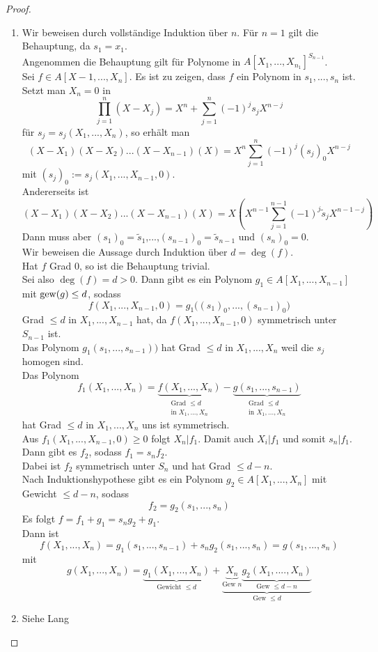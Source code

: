 	\begin{proof}
		\begin{enumerate}
			\item Wir beweisen durch vollständige Induktion über $n$.
			Für $n=1$ gilt die Behauptung, da $s_1=x_1$.\\
			Angenommen die Behauptung gilt für Polynome in $A[X_1,...,X_{n_1}]^{S_{n-1}}$.\\
			Sei $f\in A[X-1,...,X_n]$. Es ist zu zeigen, dass $f$ ein Polynom in $s_1,...,s_n$ ist.\\
			Setzt man $X_n=0$ in 
			\[\prod_{j=1}^{n}(X-X_j)=X^n+\sum_{j=1}^{n}(-1)^js_jX^{n-j}\]
			für $s_j=s_j(X_1,...,X_n)$, so erhält man
			\[(X-X_1)(X-X_2)...(X-X_{n-1})(X)=X^n\sum_{j=1}^{n}(-1)^j (s_j)_0X^{n-j}\]
			mit $(s_j)_0:=s_j(X_1,...,X_{n-1},0)$.\\
			Andererseits ist
			\[(X-X_1)(X-X_2)...(X-X_{n-1})(X)=X\left(X^{n-1}\sum_{j=1}^{n-1}(-1)^j \tilde s_j X^{n-1-j}\right)\]
			Dann muss aber $(s_1)_0=\tilde s_1$,...,$(s_{n-1})_0=\tilde{s}_{n-1}$ und $(s_n)_0=0$.\\
			Wir beweisen die Aussage durch Induktion über $d=\deg(f)$.\\
			Hat $f$ Grad $0$, so ist die Behauptung trivial.\\
			Sei also $\deg(f)=d>0$. Dann gibt es ein Polynom $g_1\in A[X_1,...,X_{n-1}]$ mit $\operatorname{gew}(g)\leq d$, sodass
			\[f(X_1,...,X_{n-1},0)=g_1\big((s_1)_0,...,(s_{n-1})_0\big)\]
			Grad $\leq d$ in $X_1,...,X_{n-1}$ hat, da $f(X_1,...,X_{n-1},0)$ symmetrisch unter $S_{n-1}$ ist.\\
			Das Polynom $g_1(s_1,...,s_{n-1})\big)$ hat Grad $\leq d$ in $X_1,...,X_n$ weil die $s_j$ homogen sind.\\
			Das Polynom
			\[f_1(X_1,...,X_n)=\underbrace{f(X_1,...,X_n)}_{\substack{\text{Grad $\leq d$}\\\text{in $X_1,...,X_n$}}}
			-\underbrace{g(s_1,...,s_{n-1})}_{\substack{\text{Grad $\leq d$}\\\text{in $X_1,...,X_n$}}}\]
			hat Grad $\leq d$ in $X_1,...,X_n$ uns ist symmetrisch. \\
			Aus $f_1(X_1,...,X_{n-1},0)\geq 0$ folgt $X_n|f_1$. Damit auch $X_i|f_1$ und somit $s_n|f_1$.\\
			Dann gibt es $f_2$, sodass $f_1=s_nf_2$.\\
			Dabei ist $f_2$ symmetrisch unter $S_n$ und hat Grad $\leq d-n$.\\
			Nach Induktionshypothese gibt es ein Polynom $g_2\in A[X_1,...,X_n]$ mit Gewicht $\leq d-n$, sodass
			\[f_2=g_2(s_1,...,s_n)\]
			Es folgt $f=f_1+g_1=s_ng_2+g_1$.\\
			Dann ist
			\[f(X_1,...,X_n)=g_1(s_1,...,s_{n-1})+s_ng_2(s_1,...,s_n)=g(s_1,...,s_n)\]
			mit
			\[g(X_1,...,X_n)=\underbrace{g_1(X_1,...,X_n)}_{\text{Gewicht $\leq d$}}+\underbrace{\underbrace{X_n}_{\text{Gew $n$}}\underbrace{g_2(X_1,....,X_n)}_{\text{Gew $\leq d-n$}}}_{\text{Gew $\leq d$}}\]
			\item Siehe Lang
		\end{enumerate}
	\end{proof}


